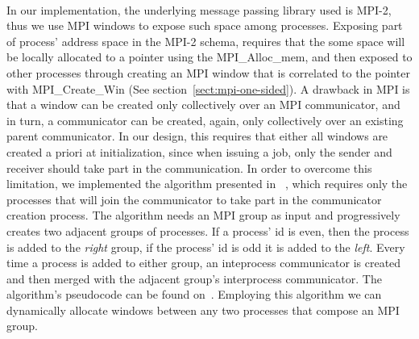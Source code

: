 \paragraph{}
In our implementation, the underlying message passing library used is MPI-2, thus we use MPI windows to
expose such space among processes.  
Exposing part of process' address space in the MPI-2 schema, requires that the some
space will be locally allocated to a pointer using the MPI\_Alloc\_mem, and then exposed to other processes
through creating an MPI window that is correlated to the pointer with MPI\_Create\_Win 
(See section~\ref{sect:mpi-one-sided}). 
A drawback in MPI is that a window can be created only collectively over an MPI communicator,
and in turn, a communicator can be created, again, only collectively over an existing parent communicator. 
In our design, this requires that either all windows are created a priori at initialization, 
since when issuing a job, only the sender and receiver should take part in the communication.  
In order to overcome this limitation, we implemented the algorithm presented in
~\cite{Dinan:2011:NCC:2042476.2042508}, which requires only the processes that will join the communicator to
take part in the communicator creation process.  The algorithm needs an MPI group as input and progressively
creates two adjacent groups of processes.  If a process' id is even, then the process is added to the \emph{right}
group, if the process' id is odd it is added to the \emph{left}.  Every time a process is added to either group, an
inteprocess communicator is created and then merged with the adjacent group's interprocess communicator. The 
algorithm's pseudocode can be found on~\cite[p.287~]{Dinan:2011:NCC:2042476.2042508}.
Employing this algorithm we can dynamically allocate windows between any two processes that compose an MPI group.


